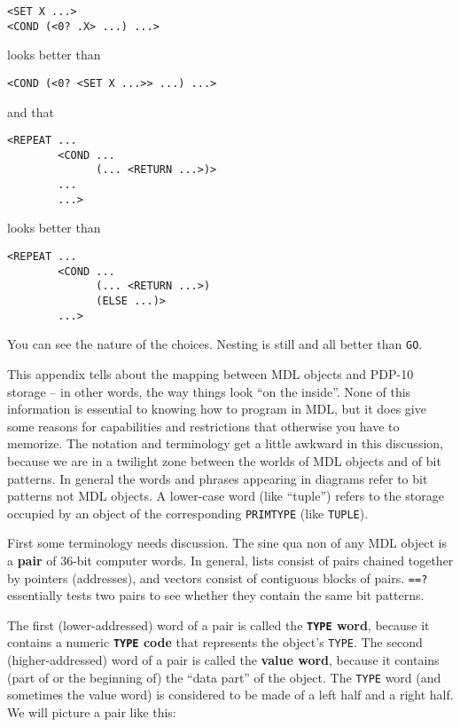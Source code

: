 \documentclass[a4paper]{scrbook}
\begin{document}
\begin{verbatim}
<SET X ...>
<COND (<0? .X> ...) ...>
\end{verbatim}

looks better than

\begin{verbatim}
<COND (<0? <SET X ...>> ...) ...>
\end{verbatim}

and that

\begin{verbatim}
<REPEAT ...
        <COND ...
              (... <RETURN ...>)>
        ...
        ...>
\end{verbatim}

looks better than

\begin{verbatim}
<REPEAT ...
        <COND ...
              (... <RETURN ...>)
              (ELSE ...)>
        ...>
\end{verbatim}

You can see the nature of the choices. Nesting is still and all better than \texttt{GO}.

\label{appendix-1.-a-look-inside}

This appendix tells about the mapping between MDL objects and PDP-10 storage -- in other words, the way things look ``on
the inside''. None of this information is essential to knowing how to program in MDL, but it does give some reasons for
capabilities and restrictions that otherwise you have to memorize. The notation and terminology get a little awkward in
this discussion, because we are in a twilight zone between the worlds of MDL objects and of bit patterns. In general the
words and phrases appearing in diagrams refer to bit patterns not MDL objects. A lower-case word (like ``tuple'') refers to
the storage occupied by an object of the corresponding \texttt{PRIMTYPE} (like \texttt{TUPLE}).

First some terminology needs discussion. The sine qua non of any MDL object is a \textbf{pair} of 36-bit computer words. In
general, lists consist of pairs chained together by pointers (addresses), and vectors consist of contiguous blocks of
pairs. \texttt{==?}  essentially tests two pairs to see whether they contain the same bit patterns.

The first (lower-addressed) word of a pair is called the \textbf{\texttt{TYPE} word}, because it contains a numeric
\textbf{\texttt{TYPE} code} that represents the object's \texttt{TYPE}. The second (higher-addressed)
word of a pair is called the \textbf{value word}, because it contains (part of or the beginning of) the ``data part'' of
the object. The \texttt{TYPE} word (and sometimes the value word) is considered to be made of a left
half and a right half. We will picture a pair like this:
\end{document}
